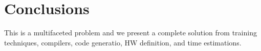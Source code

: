 \documentclass[conference]{IEEEtran}
\begin{document}



\section{Conclusions}
This is a multifaceted problem and we present a complete solution from
training techniques, compilers, code generatio, HW definition, and
time estimations.


 

%
\end{document}
